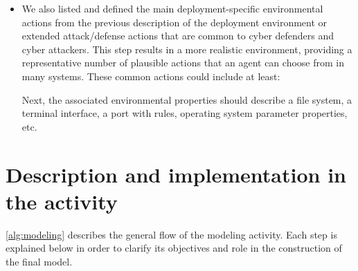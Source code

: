 \begin{itemize}
  \item We also listed and defined the main deployment-specific environmental actions from the previous description of the deployment environment or extended attack/defense actions that are common to cyber defenders and cyber attackers. This step results in a more realistic environment, providing a representative number of plausible actions that an agent can choose from in many systems.
        These common actions could include at least:
        Next, the associated environmental properties should describe a file system, a terminal interface, a port with rules, operating system parameter properties, etc.
\end{itemize}

\section{Description and implementation in the activity}

\autoref{alg:modeling} describes the general flow of the modeling activity.
Each step is explained below in order to clarify its objectives and role in the construction of the final model.


